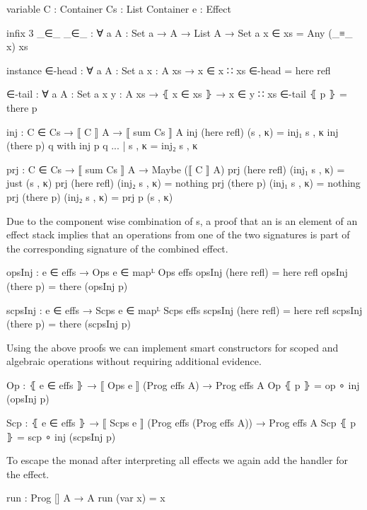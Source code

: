 \begin{code}[hide]
variable
  C  : Container
  Cs : List Container
  e : Effect
\end{code}

\begin{code}[hide] %
infix 3 _∈_
_∈_ : ∀ {a} {A : Set a} → A → List A → Set a
x ∈ xs = Any (_≡_ x) xs

instance
  ∈-head : ∀ {a} {A : Set a} {x : A} {xs} → x ∈ x ∷ xs
  ∈-head = here refl

  ∈-tail : ∀ {a} {A : Set a} {x y : A} {xs} → ⦃ x ∈ xs ⦄ → x ∈ y ∷ xs
  ∈-tail ⦃ p ⦄ = there p

inj : C ∈ Cs → ⟦ C ⟧ A → ⟦ sum Cs ⟧ A
inj (here refl) (s , κ) = inj₁ s , κ
inj (there p)   q       with inj p q
... | s , κ = inj₂ s , κ

prj : C ∈ Cs → ⟦ sum Cs ⟧ A → Maybe (⟦ C ⟧ A)
prj (here refl) (inj₁ s , κ) = just (s , κ)
prj (here refl) (inj₂ s , κ) = nothing
prj (there p)   (inj₁ s , κ) = nothing
prj (there p)   (inj₂ s , κ) = prj p (s , κ)
\end{code}
Due to the component wise combination of s, a proof that an
 is an element of an effect stack implies that an
operations from one of the two signatures is part of the corresponding
signature of the combined effect.

\begin{code}
opsInj : e ∈ effs → Ops e ∈ mapᴸ Ops effs
opsInj (here refl)  = here refl
opsInj (there p)    = there (opsInj p)

scpsInj : e ∈ effs → Scps e ∈ mapᴸ Scps effs
scpsInj (here refl)  = here refl
scpsInj (there p)    = there (scpsInj p)
\end{code}
Using the above proofs we can implement smart constructors for scoped and
algebraic operations without requiring additional evidence.

\begin{code}
Op : ⦃ e ∈ effs ⦄ → ⟦ Ops e ⟧ (Prog effs A) → Prog effs A
Op ⦃ p ⦄ = op ∘ inj (opsInj p)

Scp : ⦃ e ∈ effs ⦄ → ⟦ Scps e ⟧ (Prog effs (Prog effs A)) → Prog effs A
Scp ⦃ p ⦄ = scp ∘ inj (scpsInj p)
\end{code}
To escape the monad after interpreting all effects we again add the
handler for the  effect.

\begin{code}
run : Prog [] A → A
run (var x) = x
\end{code}


